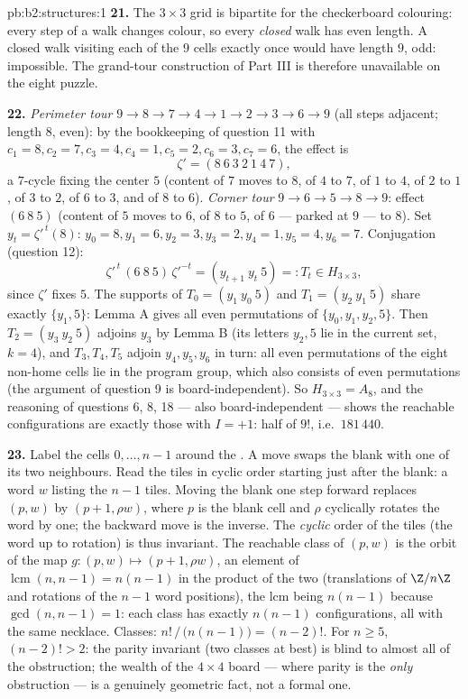 \begin{solution}{pb:b2:structures:1}
\textbf{21.} The $3 \times 3$ grid is bipartite for the
checkerboard colouring: every step of a walk changes colour, so
every \emph{closed} walk has even length. A closed walk visiting
each of the $9$ cells exactly once would have length $9$, odd:
impossible. The grand-tour construction of Part III is therefore
unavailable on the eight puzzle.

\textbf{22.} \emph{Perimeter tour} $9 \to 8 \to 7 \to 4 \to 1
\to 2 \to 3 \to 6 \to 9$ (all steps adjacent; length $8$, even):
by the bookkeeping of question 11 with $c_1 = 8, c_2 = 7, c_3 =
4, c_4 = 1, c_5 = 2, c_6 = 3, c_7 = 6$, the effect is
\[
\zeta' = (8\ 6\ 3\ 2\ 1\ 4\ 7),
\]
a $7$-cycle fixing the center $5$ (content of $7$ moves to $8$,
of $4$ to $7$, of $1$ to $4$, of $2$ to $1$, of $3$ to $2$, of
$6$ to $3$, and of $8$ to $6$). \emph{Corner tour} $9 \to 6 \to
5 \to 8 \to 9$: effect $(6\ 8\ 5)$ (content of $5$ moves to
$6$, of $8$ to $5$, of $6$ --- parked at $9$ --- to $8$). Set
$y_t = \zeta'^{\,t}(8)$: $y_0 = 8, y_1 = 6, y_2 = 3, y_3 = 2,
y_4 = 1, y_5 = 4, y_6 = 7$. Conjugation (question 12):
\[
\zeta'^{\,t}\,(6\ 8\ 5)\,\zeta'^{-t}
= (y_{t+1}\ y_t\ 5) =: T_t \in H_{3\times3},
\]
since $\zeta'$ fixes $5$. The supports of $T_0 = (y_1\ y_0\ 5)$
and $T_1 = (y_2\ y_1\ 5)$ share exactly $\{y_1, 5\}$: Lemma A
gives all even permutations of $\{y_0, y_1, y_2, 5\}$. Then
$T_2 = (y_3\ y_2\ 5)$ adjoins $y_3$ by Lemma B (its letters
$y_2, 5$ lie in the current set, $k = 4$), and $T_3, T_4, T_5$
adjoin $y_4, y_5, y_6$ in turn: all even permutations of the
eight non-home cells lie in the program group, which also
consists of even permutations (the argument of question 9 is
board-independent). So $H_{3\times3} = A_8$, and the reasoning
of questions 6, 8, 18 --- also board-independent --- shows the
reachable configurations are exactly those with $I = +1$: half
of $9!$, i.e.\ $181\,440$.

\textbf{23.} Label the cells $0, \dots, n-1$ around the .
A move swaps the blank with one of its two neighbours. Read the
tiles in cyclic order starting just after the blank: a word $w$
listing the $n - 1$ tiles. Moving the blank one step forward
replaces $(p, w)$ by $(p + 1, \rho w)$, where $p$ is the blank
cell and $\rho$ cyclically rotates the word by one; the backward
move is the inverse. The \emph{cyclic} order of the tiles (the
word up to rotation) is thus invariant. The reachable class of
$(p, w)$ is the orbit of the map $g \colon (p, w) \mapsto (p+1,
\rho w)$, an element of  $\operatorname{lcm}(n, n-1) =
n(n-1)$ in the product of the two  (translations of
$\Z/n\Z$ and rotations of the $n-1$ word positions), the lcm
being $n(n-1)$ because $\gcd(n, n-1) = 1$: each class has
exactly $n(n-1)$ configurations, all with the same necklace.
Classes: $n!\,/\,\bigl(n(n-1)\bigr) = (n-2)!$. For $n \geq 5$,
$(n-2)! > 2$: the parity invariant (two classes at best) is
blind to almost all of the obstruction; the wealth of the $4
\times 4$ board --- where parity is the \emph{only} obstruction
--- is a genuinely geometric fact, not a formal one.


\end{solution}
